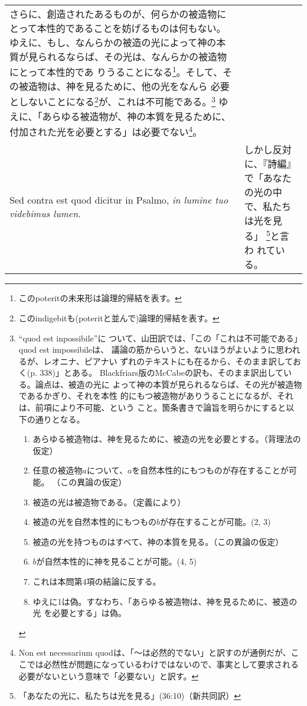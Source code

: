 \documentclass[10pt]{jsarticle} %
\begin{document}
\begin{longtable}{p{21em}p{21em}}
さらに、創造されたあるものが、何らかの被造物にとって本性的であることを妨げるものは何もない。
ゆえに、もし、なんらかの被造の光によって神の本質が見られるならば、その光は、なんらかの被造物にとって本性的であ
りうることになる\footnote{このpoteritの未来形は論理的帰結を表す。}。そして、その被造物は、神を見るために、他の光をなんら
必要としないことになる\footnote{このindigebitも(poteritと並んで)論理的帰結を表す。}が、これは不可能である。\footnote{``quod est inpossibile''に
ついて、山田訳では、「この「これは不可能である」quod est impossibileは、
議論の筋からいうと、ないほうがよいように思われるが、レオニナ、ピアナい
ずれのテキストにも在るから、そのまま訳しておく(p. 338)」とある。
Blackfriars版のMcCabeの訳も、そのまま訳出している。論点は、被造の光に
よって神の本質が見られるならば、その光が被造物であるかぎり、それを本性
的にもつ被造物がありうることになるが、それは、前項により不可能、という
こと。箇条書きで論旨を明らかにすると以下の通りとなる。
\begin{enumerate}
 \item あらゆる被造物は、神を見るために、被造の光を必要とする。（背理法の仮定）
 \item 任意の被造物$a$について、$a$を自然本性的にもつものが存在することが可能。
       （この異論の仮定）
 \item 被造の光は被造物である。（定義により）
 \item 被造の光を自然本性的にもつもの$b$が存在することが可能。(2, 3)
 \item 被造の光を持つものはすべて、神の本質を見る。（この異論の仮定）
 \item $b$が自然本性的に神を見ることが可能。(4, 5)
 \item これは本問第4項の結論に反する。
 \item ゆえに1は偽。すなわち、「あらゆる被造物は、神を見るために、被造の光
       を必要とする」は偽。
\end{enumerate}
}
ゆえに、「あらゆる被造物が、神の本質を見るために、付加された光を必要とする」は必要でない\footnote{Non est necessarium quodは、「〜は必然的でない」と訳すのが通例だが、ここでは必然性が問題になっているわけではないので、事実として要求される必要がないという意味で「必要ない」と訳す。}。

\\


{\sc  Sed contra est} quod dicitur in Psalmo, {\it in lumine tuo videbimus lumen}.

&

しかし反対に、『詩編』で「あなたの光の中で、私たちは光を見る」
\footnote{「あなたの光に、私たちは光を見る」(36:10)（新共同訳）}と言わ
れている。


\end{longtable}
\end{document}
